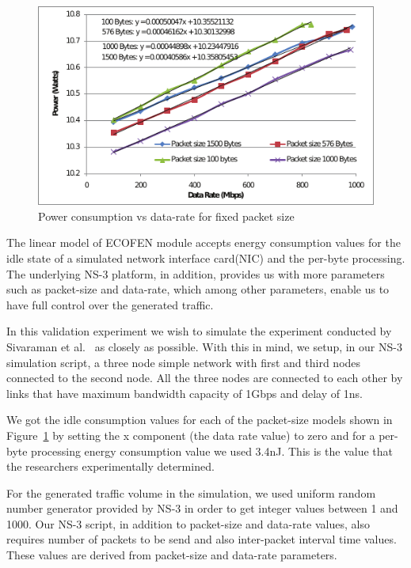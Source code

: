 \begin{figure}[ht]
	\begin{center}
		\includegraphics{images/powervsdatarate1.pdf}
		\caption{Power consumption vs data-rate for fixed packet size \cite{Sivaraman}}
		\label{fig:powervsdatarate1}
	\end{center}
\end{figure}

The linear model of ECOFEN module accepts energy consumption values for the idle state of a simulated network interface card(NIC) and the per-byte processing. The underlying NS-3 platform, in addition, provides us with more parameters such as packet-size and data-rate, which among other parameters, enable us to have full control over the generated traffic.

In this validation experiment we wish to simulate the experiment conducted by Sivaraman et al.{\ } as closely as possible. With this in mind, we setup, in our NS-3 simulation script, a three node simple network with first and third nodes connected to the second node. All the three nodes are connected to each other by links that have maximum bandwidth capacity of 1Gbps and delay of 1ns. 

We got the idle consumption values for each of the packet-size models shown in Figure~\ref{fig:powervsdatarate1} by setting the x component (the data rate value) to zero and for a per-byte processing energy consumption value we used 3.4nJ. This is the value that the researchers experimentally determined. 

For the generated traffic volume in the simulation, we used uniform random number generator provided by NS-3 in order to get integer values between 1 and 1000. Our NS-3 script, in addition to packet-size and data-rate values, also requires number of packets to be send and also inter-packet interval time values. These values are derived from packet-size and data-rate parameters. 

